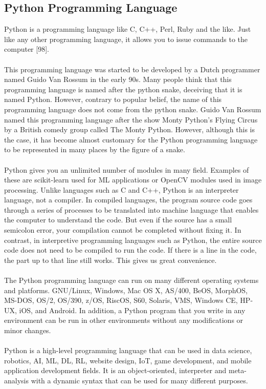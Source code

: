 \documentclass[12pt,twoside,a4]{mwbk}
\begin{document}
\subsection{Python Programming Language}
Python is a programming language like C, C++, Perl, Ruby and the like. Just like any other programming language, it allows you to issue commands to the computer [98].
\\ \\
This programming language was started to be developed by a Dutch programmer named Guido Van Rossum in the early 90s. Many people think that this programming language is named after the python snake, deceiving that it is named Python. However, contrary to popular belief, the name of this programming language does not come from the python snake. Guido Van Rossum named this programming language after the show Monty Python's Flying Circus by a British comedy group called The Monty Python. However, although this is the case, it has become almost customary for the Python programming language to be represented in many places by the figure of a snake.
\\ \\
Python gives you an unlimited number of modules in many field. Examples of these are scikit-learn used for ML applications or OpenCV modules used in image processing. Unlike languages such as C and C++, Python is an interpreter language, not a compiler. In compiled languages, the program source code goes through a series of processes to be translated into machine language that enables the computer to understand the code. But even if the source has a small semicolon error, your compilation cannot be completed without fixing it. In contrast, in interpretive programming languages such as Python, the entire source code does not need to be compiled to run the code. If there is a line in the code, the part up to that line still works. This gives us great convenience.
\\ \\
The Python programming language can run on many different operating systems and platforms. GNU/Linux, Windows, Mac OS X, AS/400, BeOS, MorphOS, MS-DOS, OS/2, OS/390, z/OS, RiscOS, S60, Solaris, VMS, Windows CE, HP-UX, iOS, and Android. In addition, a Python program that you write in any environment can be run in other environments without any modifications or minor changes.
\\ \\
Python is a high-level programming language that can be used in data science, robotics, AI, ML, DL, RL, website design, IoT, game development, and mobile application development fields. It is an object-oriented, interpreter and meta-analysis with a dynamic syntax that can be used for many different purposes.
\end{document}
